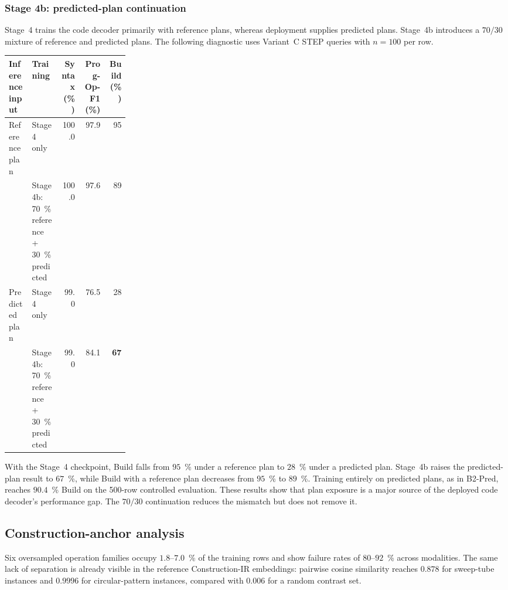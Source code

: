 \documentclass[preprint,12pt]{elsarticle}
\begin{document}
\subsubsection{Stage 4b: predicted-plan continuation}
\label{app:stage4b}

Stage~4 trains the code decoder primarily with reference plans, whereas deployment supplies
predicted plans. Stage~4b introduces a $70/30$ mixture of reference and predicted plans. The
following diagnostic uses Variant~C STEP queries with $n=100$ per row.

\begin{center}
  \footnotesize
  \begin{tabular}{l>{\raggedright\arraybackslash}p{0.24\linewidth}rrr}
    \toprule
    Inference input & Training                                    & Syntax (\%) & Prog-Op-F1 (\%) & Build (\%)  \\
    \midrule
    Reference plan  & Stage 4 only                                & 100.0       & 97.9            & 95          \\
                    & Stage 4b: 70~\% reference + 30~\% predicted & 100.0       & 97.6            & 89          \\
    Predicted plan  & Stage 4 only                                & 99.0        & 76.5            & 28          \\
                    & Stage 4b: 70~\% reference + 30~\% predicted & 99.0        & 84.1            & \textbf{67} \\
    \bottomrule
  \end{tabular}
\end{center}

With the Stage~4 checkpoint, Build falls from $95$~\% under a reference plan to $28$~\%
under a predicted plan. Stage~4b raises the predicted-plan result to $67$~\%, while Build
with a reference plan decreases from $95$~\% to $89$~\%. Training entirely on predicted
plans, as in B2-Pred, reaches $90.4$~\% Build on the 500-row controlled evaluation. These
results show that plan exposure is a major source of the deployed code decoder's performance
gap. The $70/30$ continuation reduces the mismatch but does not remove it.


\subsection{Construction-anchor analysis}
\label{app:anchor}

Six oversampled operation families occupy $1.8$--$7.0$~\% of the training rows and show
failure rates of $80$--$92$~\% across modalities. The same lack of separation is already
visible in the reference Construction-IR embeddings: pairwise cosine similarity reaches
$0.878$ for sweep-tube instances and $0.9996$ for circular-pattern instances, compared with
$0.006$ for a random contrast set.
\end{document}
